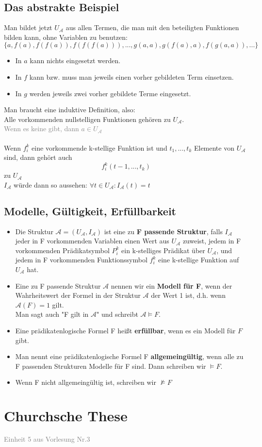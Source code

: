 \documentclass{article}
\begin{document}
	\subsection{Das abstrakte Beispiel}
	Man bildet jetzt $U_\mathcal{A}$ aus allen Termen, die man mit den beteiligten Funktionen bilden kann, ohne Variablen zu benutzen: \\
	\[\{a, f(a), f(f(a)), f(f(f(a))),...,g(a,a), g(f(a),a),f(g(a,a)),...\}\]
	\begin{itemize}
		\item In $a$ kann nichts eingesetzt werden.
		\item In $f$ kann bzw. muss man jeweils einen vorher gebildeten Term einsetzen.
		\item In $g$ werden jeweils zwei vorher gebildete Terme eingesetzt.
	\end{itemize}
	Man braucht eine induktive Definition, also: \\
	Alle vorkommenden nullstelligen Funktionen gehören zu $U_\mathcal{A}$.\\
	\textcolor{gray}{Wenn es keine gibt, dann $a \in U_\mathcal{A}$} \\
	\\
	Wenn $f^k_i$ eine vorkommende k-stellige Funktion ist und $t_1,..., t_k$ Elemente von $U_\mathcal{A}$ sind, dann gehört auch
	\[f^k_i(t-1,...,t_k)\]
	zu $U_\mathcal{A}$
	\\
	$I_\mathcal{A}$ würde dann so aussehen: $\forall t \in U_\mathcal{A}: I_\mathcal{A}(t) = t$
	\subsection{Modelle, Gültigkeit, Erfüllbarkeit}
	\begin{itemize}
		\item Die Struktur $\mathcal{A} = (U_\mathcal{A}, I_\mathcal{A})$ ist eine zu \textbf{F passende Struktur}, falls $I_\mathcal{A}$ jeder in F vorkommenden Variablen einen Wert aus $U_\mathcal{A}$ zuweist, jedem in F vorkommenden Prädikatsymbol $P^k_i$ ein k-stelliges Prädikat über $U_\mathcal{A}$, und jedem in F vorkommenden Funktionssymbol $f^k_i$ eine k-stellige Funktion auf $U_\mathcal{A}$ hat.
		\item Eine zu F passende Struktur $\mathcal{A}$ nennen wir ein \textbf{Modell für F}, wenn der Wahrheitswert der Formel in der Struktur $\mathcal{A}$ der Wert 1 ist, d.h. wenn $\mathcal{A}(F) = 1$ gilt. \\
		Man sagt auch "F gilt in $\mathcal{A}$" und schreibt $\mathcal{A} \vDash F$.
		\item Eine prädikatenlogische Formel F heißt \textbf{erfüllbar}, wenn es ein Modell für $F$ gibt.
		\item Man nennt eine prädikatenlogische Formel F \textbf{allgemeingültig}, wenn alle zu F passenden Strukturen Modelle für F sind. Dann schreiben wir $\vDash F$.
		\item Wenn F nicht allgemeingültig ist, schreiben wir $\nvDash F$
	\end{itemize}
	\section{Churchsche These}
	\textcolor{gray}{Einheit 5 aus Vorlesung Nr.3}
\end{document}
